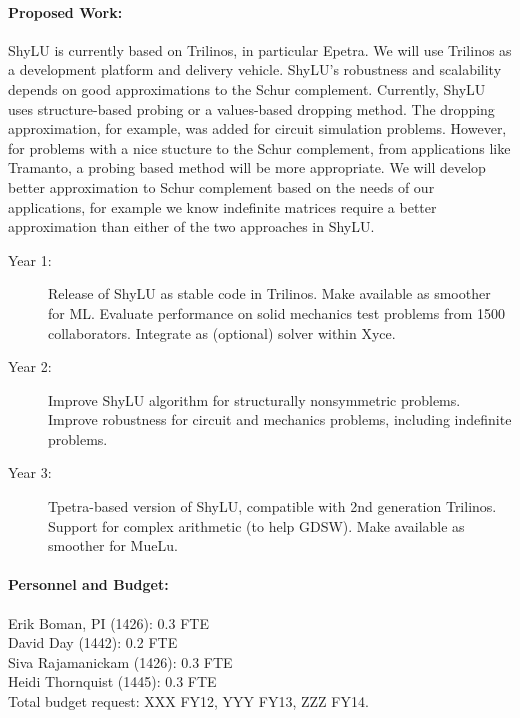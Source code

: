 \documentclass[10pt]{amsart}
\begin{document}
\paragraph{\bf Proposed Work:}
ShyLU is currently based on Trilinos, in particular Epetra.
We will use Trilinos as a development platform and delivery vehicle.
ShyLU's robustness and scalability depends on good
approximations to the Schur complement. Currently, ShyLU uses 
structure-based probing
or a values-based dropping method. The dropping approximation, for
example, was added for circuit simulation problems. However, for problems
with a nice stucture to the Schur complement, from applications like Tramanto,
a probing based method will be more appropriate. We will develop better
approximation to Schur complement based on the needs of our applications, for
example we know indefinite matrices require a better approximation than either
of the two approaches in ShyLU.  

\begin{description}
\item[Year 1:] 
Release of ShyLU as stable code in Trilinos.
Make available as smoother for ML.
Evaluate performance on solid mechanics test problems from 
1500 collaborators.
Integrate as (optional) solver within Xyce. 
\item[Year 2:] 
Improve ShyLU algorithm for structurally nonsymmetric problems.
Improve robustness for circuit and mechanics problems, including 
indefinite problems.
\item[Year 3:] 
Tpetra-based version of ShyLU, compatible with 2nd generation Trilinos.
Support for complex arithmetic (to help GDSW).
Make available as smoother for MueLu.
\end{description}


\paragraph{\bf Personnel and Budget:}
Erik Boman, PI (1426): 0.3 FTE\\
David Day (1442): 0.2 FTE\\
Siva Rajamanickam (1426): 0.3 FTE\\
Heidi Thornquist (1445): 0.3 FTE\\

Total budget request: XXX FY12, YYY FY13, ZZZ FY14.
\end{document}
